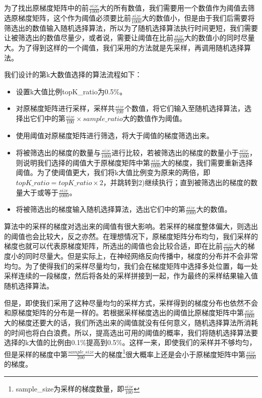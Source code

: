 为了找出原梯度矩阵中的前$\frac{size}{1000}$大的所有数值，我们需要用一个数值作为阈值去筛选原梯度矩阵，这个作为阈值必须要比前$\frac{size}{1000}$大的数值小，但是由于我们后需要将筛选出的数值输入随机选择算法，所以为了随机选择算法执行时间更短，我们需要让被筛选出的数值尽量少，或者说，需要让阈值在比前$\frac{size}{1000}$大的数值小的同时尽量大。为了得到这样的一个阈值，我们采用的方法就是先采样，再调用随机选择算法。

我们设计的第k大数值选择的算法流程如下：
\begin{itemize}
  \item [1)]
  设置k大值比例topK\_ratio为0.5\%。
  \item [2)]
  对原梯度矩阵进行采样，采样共$\frac{size}{100}$个数值，将它们输入至随机选择算法，选择出它们中的第$\frac{size}{100}\times sample\_ratio$大的数值作为阈值。
  \item [3)]
  使用阈值对原梯度矩阵进行筛选，将大于阈值的梯度筛选出来。
  \item [4)]
  将被筛选出的梯度的数量与$\frac{size}{1000}$进行比较，若被筛选出的梯度的数量小于$\frac{size}{1000}$，则说明我们选择的阈值大于原梯度矩阵中第$\frac{size}{1000}$大的梯度，我们需要重新选择阈值。为了使阈值更大，我们将k大值比例变为原来的两倍，即$topK\_ratio = topK\_ratio \times 2$，并跳转到2)继续执行；直到被筛选出的梯度的数量大于或等于$\frac{size}{1000}$。
  \item [5)]
  将被筛选出的梯度输入随机选择算法，选出它们中的第$\frac{size}{1000}$大的数值。
\end{itemize}

算法中的采样的梯度对选出来的阈值有很大影响。若采样的梯度整体偏大，则选出的阈值也会比较大，反之亦然。在理想情况下，原梯度矩阵分布均匀，我们采样的梯度也就可以代表原梯度矩阵，所选出的阈值也会比较合适，即在比前$\frac{size}{1000}$大的梯度小的同时尽量大。但是实际上，在神经网络反向传播中，梯度的分布并不会非常均匀。为了使得我们的采样尽量均匀，我们会在梯度矩阵中选择多处位置，每一处采样连续的一段梯度，然后将各处的采样拼接到一起，作为最终的采样结果输入值随机选择算法。

但是，即使我们采用了这种尽量均匀的采样方式，采样得到的梯度分布也依然不会和原梯度矩阵的分布是一样的。若根据采样梯度选出的阈值比原梯度矩阵中第$\frac{size}{1000}$大的梯度还要大的话，我们所选出来的阈值就没有任何意义，随机选择算法所消耗的时间也将白白浪费。所以，提高选出可用的阈值的概率，我们将随机选择算法要选择的k大值的比例由0.1\%提高到0.5\%。这样一来，即使我们的采样并不够均匀，但是采样的梯度中第$\frac{sample\_size}{200}$大的梯度\footnote{sample\_size为采样的梯度数量，即$\frac{size}{100}$}很大概率上还是会小于原梯度矩阵中第$\frac{size}{1000}$的梯度。

